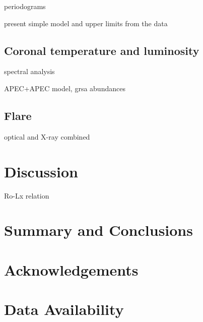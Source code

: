 \documentclass[twocolumn]{aastex631}
\begin{document}
periodograms

present simple model and upper limits from the data

\subsection{Coronal temperature and luminosity}

spectral analysis

APEC+APEC model, grsa abundances

\subsection{Flare}

optical and X-ray combined

\section{Discussion}

Ro-Lx relation

\section{Summary and Conclusions}


\section{Acknowledgements}
\citep{lightkurvecollaboration2018lightkurve}

\section{Data Availability}



\end{document}
